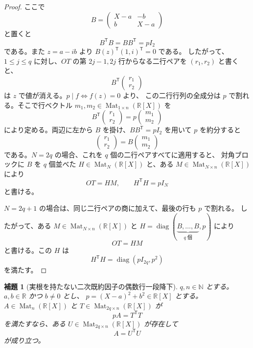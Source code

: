 \documentclass[uplatex,dvipdfmx]{jsarticle}
\newcommand{\Poly}{\mathbb{R}[X]}
\newcommand{\Mat}{\operatorname{Mat}}
\theoremstyle{matrixsosdefinition}
\newtheorem{lemma}[theorem]{補題}
\begin{document}
\begin{proof}
  ここで
  \[
    B=\begin{pmatrix}X-a&-b\\ b&X-a\end{pmatrix}
  \]
  と置くと
  \[
    B^{\mathsf T}B=BB^{\mathsf T}=pI_2
  \]
  である。また \(z=a-ib\) より \(B(z)^{\mathsf T}(1,i)^{\mathsf T}=0\) である。
  したがって、\(1\le j\le q\) に対し、\(OT\) の第 \(2j-1,2j\) 行からなる二行ペアを
  \((r_1,r_2)\) と書くと、
  \[
    B^{\mathsf T}\begin{pmatrix}r_1\\r_2\end{pmatrix}
  \]
  は \(z\) で値が消える。\(p\mid f\Longleftrightarrow f(z)=0\) より、
  この二行行列の全成分は \(p\) で割れる。そこで行ベクトル
  \(m_1,m_2\in\Mat_{1\times n}(\Poly)\) を
  \[
    B^{\mathsf T}\begin{pmatrix}r_1\\r_2\end{pmatrix}
      =
    p\begin{pmatrix}m_1\\m_2\end{pmatrix}
  \]
  により定める。両辺に左から \(B\) を掛け、\(BB^{\mathsf T}=pI_2\) を用いて
  \(p\) を約分すると
  \[
    \begin{pmatrix}r_1\\r_2\end{pmatrix}
      =
    B\begin{pmatrix}m_1\\m_2\end{pmatrix}
  \]
  である。\(N=2q\) の場合、これを \(q\) 個の二行ペアすべてに適用すると、
  対角ブロックに \(B\) を \(q\) 個並べた
  \(H\in\Mat_N(\Poly)\) と、ある \(M\in\Mat_{N\times n}(\Poly)\) により
  \[
    OT=HM,\qquad H^{\mathsf T}H=pI_N
  \]
  と書ける。

  \(N=2q+1\) の場合は、同じ二行ペアの商に加えて、最後の行も \(p\) で割れる。
  したがって、ある \(M\in\Mat_{N\times n}(\Poly)\) と
  \(H=\operatorname{diag}(\underbrace{B,\ldots,B}_{q\text{ 個}},p)\) により
  \[
    OT=HM
  \]
  と書ける。この \(H\) は
  \[
    H^{\mathsf T}H=\operatorname{diag}(pI_{2q},p^2)
  \]
  を満たす。
\end{proof}

\begin{lemma}[実根を持たない二次既約因子の偶数行一段降下]
  \label{lem:no-real-root-even-row-one-step}
  \(q,n\in\mathbb{N}\) とする。
  \(a,b\in\mathbb{R}\) かつ \(b\ne0\) とし、
  \(p=(X-a)^2+b^2\in\Poly\) とする。
  \(A\in\Mat_n(\Poly)\) と \(T\in\Mat_{2q\times n}(\Poly)\) が
  \[
    pA=T^{\mathsf T}T
  \]
  を満たすなら、ある \(U\in\Mat_{2q\times n}(\Poly)\) が存在して
  \[
    A=U^{\mathsf T}U
  \]
  が成り立つ。
\end{lemma}
\end{document}
